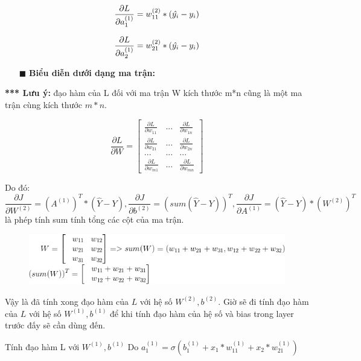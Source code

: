 $$\frac{\partial L}{\partial a_1 ^ {(1)}} =  w_{11} ^ {(2)}  *     (\hat{y_i}-y_i) \newline \newline$$

$$\frac{\partial L}{\partial a_2 ^ {(1)}} =  w_{21} ^ {(2)}  *     (\hat{y_i}-y_i) \newline \newline $$


\begin{itemize}
\item[$\blacksquare$] \textbf{Biểu diễn dưới dạng ma trận:}
\end{itemize} 
\textbf{*** Lưu ý:} đạo hàm của L đối với ma trận W kích thước m*n cũng là một ma trận cùng kích thước $m*n$.

$$ \frac{\partial L}{\partial W} =  \begin{bmatrix}\frac{\partial L}{\partial w_{11}}&...&\frac{\partial L}{\partial w_{1n}}\\
 \frac{\partial L}{\partial w_{21}}&...&\frac{\partial L}{\partial w_{2n}}\\
 ...&...&...\\\frac{\partial L}{\partial w_{m1}}&...&\frac{\partial L}{\partial w_{mn}}\end{bmatrix} $$

Do đó:
$$\frac{\partial J}{\partial W^{(2)}} = (A^{(1)})^T * (\hat{Y} - Y), \frac{\partial J}{\partial b^{(2)}} = (sum(\hat{Y} - Y))^T,  \frac{\partial J}{\partial A^{(1)}} = (\hat{Y} - Y) * (W^{(2)})^T$$ 
là phép tính sum tính tổng các cột của ma trận.

\FloatBarrier
\begin{figure}[htp]
\begin{center}
\includegraphics[scale=0.8]{chap2/c2_figs/6.jpg}
\end{center}
\label{fig:feed_forward}
\end{figure}
\FloatBarrier

Vậy là đã tính xong đạo hàm của $L$ với hệ số $W^{(2)}, b^{(2)}$. Giờ sẽ đi tính đạo hàm của $L$ với hệ số $W^{(1)}, b^{(1)}$ để khi tính đạo hàm của hệ số và bias trong layer trước đấy sẽ cần dùng đến.

Tính đạo hàm L với $W^{(1)}, b^{(1)}$
Do $ a_1^{(1)} = \sigma(b_1^{(1)} + x_1*w_{11}^{(1)} + x_2*w_{21}^{(1)})$ 

